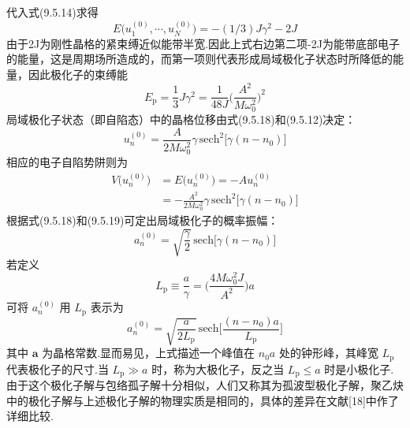 代入式(9.5.14)求得
\begin{equation}
  E\bigl(u_{1}^{(0)},\cdots,u_{N}^{(0)}\bigr)
  =-\left(1/3\right)J\gamma^{2}-2J
\end{equation}
由于2J为刚性晶格的紧束缚近似能带半宽.因此上式右边第二项-2J为能带底部电子的能量，这是周期场所造成的，而第一项则代表形成局域极化子状态时所降低的能量，因此极化子的束缚能
\begin{equation}
  E_{\mathrm p}=\frac{1}{3}J\gamma^{2}
  =\frac{1}{48J}\biggl(\frac{A^{2}}{M\omega_{0}^{2}}\biggr)^{2}
\end{equation}
局域极化子状态（即自陷态）中的晶格位移由式(9.5.18)和(9.5.12)决定：
\begin{equation}
  u_{n}^{(0)}=\frac{A}{2M\omega_{0}^{2}}\gamma\,
  \mathrm{sech}^{2}\bigl[\gamma\left(n-n_{0}\right)\bigr]
\end{equation}
相应的电子自陷势阱则为
\begin{equation}
\begin{aligned}
  V\bigl(u_{n}^{(0)}\bigr)&=E\bigl(u_{n}^{(0)}\bigr)=-Au_{n}^{(0)}\\
  &=-\frac{A^{2}}{2M\omega_{0}^{2}}\gamma\,
  \mathrm{sech}^{2}\bigl[\gamma\left(n-n_{0}\right)\bigr]
\end{aligned}
\end{equation}
根据式(9.5.18)和(9.5.19)可定出局域极化子的概率振幅：
\begin{equation}
  a_{n}^{(0)}=\sqrt{\frac{\gamma}{2}}\,
  \mathrm{sech}\bigl[\gamma\left(n-n_{0}\right)\bigr]
\end{equation}
若定义
\begin{equation}
  L_{\mathrm p}\equiv\frac{a}{\gamma}
  =\biggl(\frac{4M\omega_{0}^{2}J}{A^{2}}\biggr)a
\end{equation}
可将 $a_{n}^{(0)}$ 用 $L_{\mathrm p}$ 表示为
\begin{equation}
  a_{n}^{(0)}=\sqrt{\frac{a}{2L_{\mathrm p}}}\,
  \mathrm{sech}\biggl[\frac{\left(n-n_{0}\right)a}{L_{\mathrm p}}\biggr]
\end{equation}
其中 $\boldsymbol{a}$ 为晶格常数.显而易见，上式描述一个峰值在 $n_{0}a$ 处的钟形峰，其峰宽 $L_{\mathrm p}$ 代表极化子的尺寸.当 $L_{\mathrm p}\gg a$ 时，称为大极化子，反之当 $L_{\mathrm p}\leqslant a$ 时是小极化子.由于这个极化子解与包络孤子解十分相似，人们又称其为孤波型极化子解，聚乙炔中的极化子解与上述极化子解的物理实质是相同的，具体的差异在文献[18]中作了详细比较.

